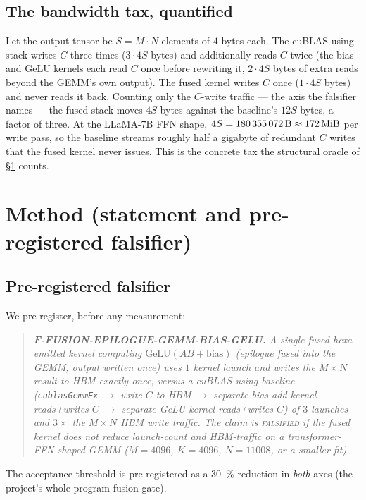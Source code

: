 \documentclass[11pt,a4paper]{article}
\begin{document}
\subsection{The bandwidth tax, quantified}
\label{sec:tax}

Let the output tensor be $S = M\!\cdot\!N$ elements of $4$ bytes each. The
cuBLAS-using stack writes $C$ three times ($3 \cdot 4S$ bytes) and additionally
reads $C$ twice (the bias and GeLU kernels each read $C$ once before rewriting
it, $2 \cdot 4S$ bytes of extra reads beyond the GEMM's own output). The fused
kernel writes $C$ once ($1 \cdot 4S$ bytes) and never reads it back. Counting
only the $C$-write traffic --- the axis the falsifier names --- the fused stack
moves $4S$ bytes against the baseline's $12S$ bytes, a factor of three. At the
LLaMA-7B FFN shape, $4S = \SI{180355072}{\byte} \approx \SI{172}{\mebi\byte}$
per write pass, so the baseline streams roughly half a gigabyte of redundant
$C$ writes that the fused kernel never issues. This is the concrete tax the
structural oracle of \S\ref{sec:method} counts.

\section{Method (statement and pre-registered falsifier)}
\label{sec:method}

\subsection{Pre-registered falsifier}

We pre-register, before any measurement:

\begin{quote}\itshape
\textbf{F-FUSION-EPILOGUE-GEMM-BIAS-GELU.} A single fused hexa-emitted kernel
computing $\mathrm{GeLU}(AB + \mathrm{bias})$ (epilogue fused into the GEMM,
output written once) uses $1$ kernel launch and writes the $M\times N$ result
to HBM exactly once, versus a cuBLAS-using baseline (\texttt{cublasGemmEx}
$\to$ write $C$ to HBM $\to$ separate bias-add kernel reads+writes $C$ $\to$
separate GeLU kernel reads+writes $C$) of $3$ launches and $3\times$ the
$M\times N$ HBM write traffic. The claim is \textsc{falsified} if the fused
kernel does not reduce launch-count \emph{and} HBM-traffic on a
transformer-FFN-shaped GEMM ($M=4096$, $K=4096$, $N=11008$, or a smaller fit).
\end{quote}

\noindent The acceptance threshold is pre-registered as a
\SI{30}{\percent} reduction in \emph{both} axes (the project's
whole-program-fusion gate).
\end{document}
